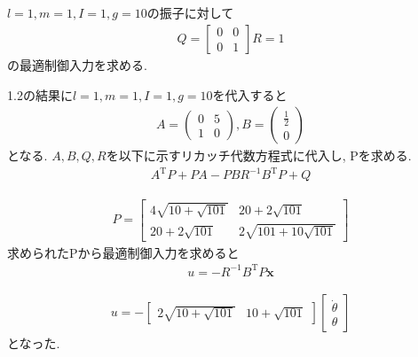 \documentclass[a4paper,11pt]{jsarticle}
\begin{document}
\subsection{}
$l=1,m=1,I=1,g=10$の振子に対して
\begin{align}
	Q=\left[
	\begin{array}{cc}
		0 & 0 \\
		0 & 1
	\end{array}
	\right]
	R=1
\end{align}
の最適制御入力を求める.

1.2の結果に$l=1,m=1,I=1,g=10$を代入すると
\begin{align}
	A=\left(
	\begin{array}{cc}
	0 & 5 \\
	1 & 0
	\end{array}\right),
	B=\left(
	\begin{array}{c}
	\frac{1}{2} \\
	0
	\end{array}\right)
\end{align}
となる. $A,B,Q,R$を以下に示すリカッチ代数方程式に代入し, Pを求める.
\begin{align}
	A^{\mathrm{T}}P+PA-PBR^{-1}B^{\mathrm{T}}P+Q
\end{align}

\begin{align}
	P=\left[
	\begin{array}{cc}
		4\sqrt{10+\sqrt{101}} & 20+2\sqrt{101} \\
		20+2\sqrt{101} & 2\sqrt{101+10\sqrt{101}}
	\end{array}
	\right]
\end{align}
求められたPから最適制御入力を求めると
\begin{align}
	u=-R^{-1}B^{\mathrm{T}}P\bm{x}
\end{align}

\begin{align}
	u=-\left[
	\begin{array}{cc}
		2\sqrt{10+\sqrt{101}} & 10+\sqrt{101}
	\end{array}
	\right]\left[
	\begin{array}{c}
		\dot{\theta} \\
		\theta
	\end{array}
	\right]
\end{align}
となった.
\end{document}
